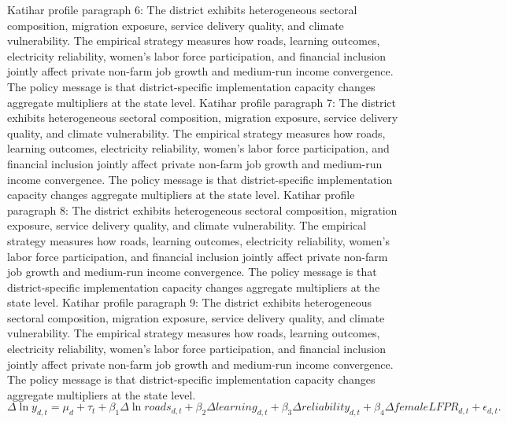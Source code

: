 \documentclass[preprint,12pt]{elsarticle}
\begin{document}
Katihar profile paragraph 6: The district exhibits heterogeneous sectoral composition, migration exposure, service delivery quality, and climate vulnerability. The empirical strategy measures how roads, learning outcomes, electricity reliability, women's labor force participation, and financial inclusion jointly affect private non-farm job growth and medium-run income convergence. The policy message is that district-specific implementation capacity changes aggregate multipliers at the state level.
Katihar profile paragraph 7: The district exhibits heterogeneous sectoral composition, migration exposure, service delivery quality, and climate vulnerability. The empirical strategy measures how roads, learning outcomes, electricity reliability, women's labor force participation, and financial inclusion jointly affect private non-farm job growth and medium-run income convergence. The policy message is that district-specific implementation capacity changes aggregate multipliers at the state level.
Katihar profile paragraph 8: The district exhibits heterogeneous sectoral composition, migration exposure, service delivery quality, and climate vulnerability. The empirical strategy measures how roads, learning outcomes, electricity reliability, women's labor force participation, and financial inclusion jointly affect private non-farm job growth and medium-run income convergence. The policy message is that district-specific implementation capacity changes aggregate multipliers at the state level.
Katihar profile paragraph 9: The district exhibits heterogeneous sectoral composition, migration exposure, service delivery quality, and climate vulnerability. The empirical strategy measures how roads, learning outcomes, electricity reliability, women's labor force participation, and financial inclusion jointly affect private non-farm job growth and medium-run income convergence. The policy message is that district-specific implementation capacity changes aggregate multipliers at the state level.
\begin{equation}\Delta \ln y_{d,t}=\mu_d+\tau_t+\beta_1\Delta\ln roads_{d,t}+\beta_2\Delta learning_{d,t}+\beta_3\Delta reliability_{d,t}+\beta_4\Delta femaleLFPR_{d,t}+\epsilon_{d,t}.\end{equation}
\end{document}
